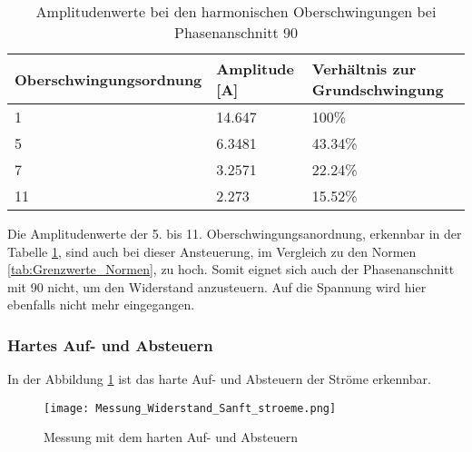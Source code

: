 \begin{table}[ht!]
	\centering
	\begin{tabular}{|l|l|l|}
		\hline
		Oberschwingungsordnung 	& Amplitude [A] & Verhältnis zur Grundschwingung	\\ \hline
		1       				& 14.647   		& 100\%								\\ \hline
		5      					& 6.3481    	& 43.34\%							\\ \hline
		7      					& 3.2571    	& 22.24\%							\\ \hline
		11      				& 2.273    		& 15.52\%							\\ \hline
	\end{tabular}
	\caption{Amplitudenwerte bei den harmonischen Oberschwingungen bei Phasenanschnitt 90\textdegree}\label{tab:Phas_90_Stroeme}
\end{table}

Die Amplitudenwerte der 5. bis 11. Oberschwingungsanordnung, erkennbar in der Tabelle \ref{tab:Phas_90_Stroeme}, sind auch bei dieser Ansteuerung, im Vergleich zu den Normen \ref{tab:Grenzwerte_Normen}, zu hoch. Somit eignet sich auch der Phasenanschnitt mit 90\textdegree \hspace{0.02cm} nicht, um den Widerstand anzusteuern. Auf die Spannung wird hier ebenfalls nicht mehr eingegangen. 


\newpage
\subsubsection*{Hartes Auf- und Absteuern}

In der Abbildung \ref{fig:Mess_Widerstand_Sanft_stroeme} ist das harte Auf- und Absteuern der Ströme erkennbar. 

\begin{figure}[ht!]
	\centering
	\texttt{[image: Messung\_Widerstand\_Sanft\_stroeme.png]}	
	\caption{Messung mit dem harten Auf- und Absteuern}\label{fig:Mess_Widerstand_Sanft_stroeme}
\end{figure}


